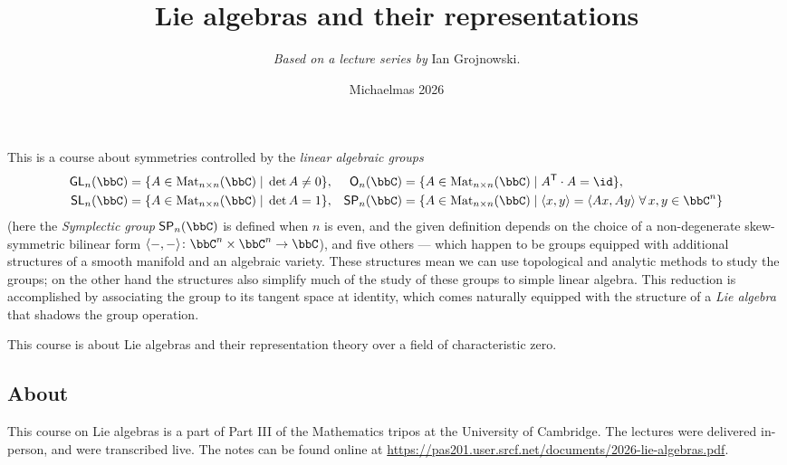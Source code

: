 \title{Lie algebras and their representations}
\author{\textit{Based on a lecture series by} Ian Grojnowski.}
\date{Michaelmas 2026}
\maketitle

\newcommand{\mat}[1]{\left(\begin{smallmatrix} #1 \end{smallmatrix}\right)}
\newcommand{\Mat}[1]{\textnormal{Mat}_{#1 \times #1}}
\newcommand{\adj}{\textnormal{ad}}
\renewcommand{\char}{\textnormal{ch}}
\newcommand{\frakg}{\mathfrak{g}}
\newcommand{\frakh}{\mathfrak{h}}
\newcommand{\fraka}{\mathfrak{a}}
\newcommand{\bb}{\mathfrak{b}}
\newcommand{\nn}{\mathfrak{n}}
\renewcommand{\tt}{\mathfrak{t}}
\renewcommand{\gl}{\mathfrak{gl}}
\renewcommand{\sl}{\mathfrak{sl}}
\newcommand{\so}{\mathfrak{so}}
\renewcommand{\sp}{\mathfrak{sp}}
\renewcommand{\sf}{\mathsf}
\newcommand{\iddots}{\reflectbox{$\ddots$}}

This is a course about symmetries controlled by the \emph{linear algebraic groups}
\begin{align*}
    \sf{GL}_n(\bbC) &=\{ A\in \Mat{n}(\bbC) \;|\; \det A \neq 0\}, &
    \sf{O}_n(\bbC) &=\{ A\in \Mat{n}(\bbC) \;|\; A^{\sf{T}} \cdot A = \id \}, \\
    \sf{SL}_n(\bbC) &=\{ A\in \Mat{n}(\bbC) \;|\; \det A = 1\}, &
    \sf{SP}_{n}(\bbC) &=\{ A\in \Mat{n}(\bbC) \;|\; \langle x,y \rangle =
    \langle Ax, Ay\rangle \; \forall \, x,y\in \bbC^{n}\}
\end{align*}
(here the \emph{Symplectic group} $\sf{SP}_n(\bbC)$ is defined
when $n$ is even, and the given definition depends on the choice of a
non-degenerate skew-symmetric bilinear form $\langle-,-\rangle\colon
\bbC^n\times \bbC^n\to \bbC$), and five others --- which happen to be groups
equipped with additional structures of a smooth manifold and an algebraic
variety. These structures mean we can use topological and analytic methods to
study the groups; on the other hand the structures also simplify much of the
study of these groups to simple linear algebra. This reduction is accomplished
by associating the group to its tangent space at identity, which comes naturally
equipped with the structure of a \emph{Lie algebra} that shadows the group
operation. 

This course is about Lie algebras and their representation theory over a field of characteristic zero.

\subsection{About} This course on Lie algebras is a part of Part III of the
Mathematics tripos at the University of Cambridge. The lectures were delivered in-person, and were transcribed live. The notes can be found
online at \url{https://pas201.user.srcf.net/documents/2026-lie-algebras.pdf}. 

